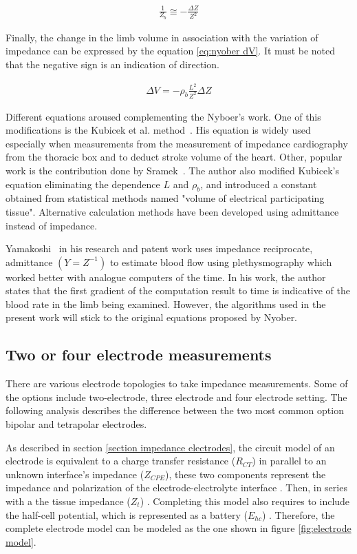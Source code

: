 \begin{align}
	\label{eq:parallel model2}
	\frac{1}{Z_b}\cong -\frac{\Delta Z}{Z^2}
\end{align}

Finally, the change in the limb volume in association with the variation of impedance can be expressed by the equation \ref{eq:nyober dV}. It must be noted that the negative sign is an indication of direction.

\begin{align}
	\label{eq:nyober dV}
	\Delta V = -\rho_b \frac{L^2}{Z^2}\Delta Z
\end{align}

Different equations aroused complementing the Nyboer's work. One of this modifications is the Kubicek et al. method~\cite{karnegis1966development, kubicek1970impedance, kubicek1979impedance}. His equation is widely used especially when measurements from the measurement of impedance cardiography from the thoracic box and to deduct stroke volume of the heart. Other, popular work is the contribution done by Sramek~\cite{sramek1986bomed}. The author also modified Kubicek's equation eliminating the dependence $L$ and $\rho_b$,  and introduced a constant obtained from statistical methods named "volume of electrical participating tissue". Alternative calculation methods have been developed using admittance instead of impedance.

Yamakoshi~\cite{shimazu1982evaluation,yamakoshi1980limb,yamakoshi1978admittance} in his research and patent work uses impedance reciprocate, admittance $(Y=Z^{-1})$ to estimate blood flow using plethysmography which worked better with analogue computers of the time. In his work, the author states that the first gradient of the computation result to time is indicative of the blood rate in the limb being examined. However, the algorithms used in the present work will stick to the original equations proposed by Nyober.
\subsection{Two or four electrode measurements}
There are various electrode topologies to take impedance measurements. Some of the options include two-electrode, three electrode and four electrode setting. The following analysis describes the difference between the two most common option bipolar and tetrapolar electrodes.

As described in section \ref{section impedance electrodes}, the circuit model of an electrode is equivalent to a charge transfer resistance ($R_{CT}$) in parallel to an unknown interface's impedance ($Z_{CPE}$), these two components represent the impedance and polarization of the electrode-electrolyte interface \cite{neuman2000biomedical}. Then, in series with a the tissue impedance ($Z_t$) \cite{lvovich2012impedance}. Completing this model also requires to include the half-cell potential, which is represented as a battery ($E_{hc}$) \cite{neuman2000biomedical}. Therefore, the complete electrode model can be modeled as the one shown in figure \ref{fig:electrode model}.

